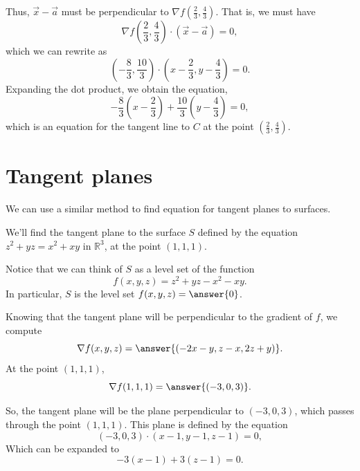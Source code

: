 \documentclass{ximera}
\begin{document}
\begin{example}
\begin{image}
\end{image}

Thus, $\vec{x}-\vec{a}$ must be perpendicular to $\nabla f\left(\frac{2}{3}, \frac{4}{3}\right)$. That is, we must have
\[
\nabla f\left(\frac{2}{3}, \frac{4}{3}\right)\cdot (\vec{x}-\vec{a}) = 0,
\]
which we can rewrite as
\[
\left(-\frac{8}{3},\frac{10}{3}\right) \cdot \left(x - \frac{2}{3}, y-\frac{4}{3}\right)=0.
\]
Expanding the dot product, we obtain the equation,
\[
-\frac{8}{3}\left(x-\frac{2}{3}\right)+\frac{10}{3}\left(y-\frac{4}{3}\right)=0,
\]
which is an equation for the tangent line to $C$ at the point $\left(\frac{2}{3}, \frac{4}{3}\right)$.
\end{example}

\section*{Tangent planes}

We can use a similar method to find equation for tangent planes to surfaces.

\begin{example}
We'll find the tangent plane to the surface $S$ defined by the equation $z^2 +yz = x^2+xy$ in $\mathbb{R}^3$, at the point $(1,1,1)$.

Notice that we can think of $S$ as a level set of the function 
\[
f(x,y,z) = z^2+yz-x^2-xy.
\]
In particular, $S$ is the level set $f(x,y,z) = \answer{0}$.

Knowing that the tangent plane will be perpendicular to the gradient of $f$, we compute
\[
\nabla f(x,y,z) = \answer{(-2x-y,z-x,2z+y)}.
\]
At the point $(1,1,1)$, 
\[
\nabla f(1,1,1) = \answer{(-3, 0, 3)}.
\]

So, the tangent plane will be the plane perpendicular to $(-3,0,3)$, which passes through the point $(1,1,1)$. This plane is defined by the equation
\[
(-3,0,3)\cdot (x-1, y-1, z-1) = 0,
\]
Which can be expanded to
\[
-3(x-1)+3(z-1) = 0.
\]
\end{example}
\end{document}
